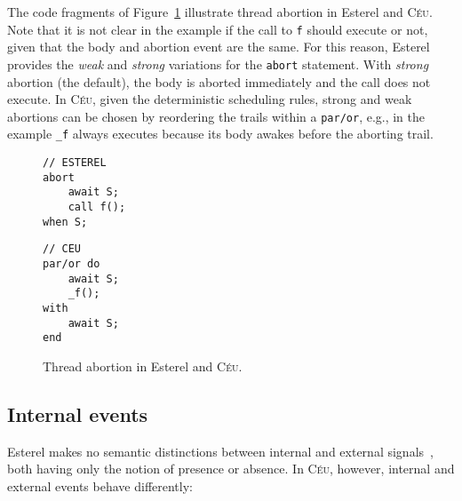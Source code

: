\documentclass{acm_proc_article-sp}
\newcommand{\CEU}{\textsc{C\'{e}u}\xspace}
\newcommand{\code}[1] {{\small{\texttt{#1}}}}
\newcommand{\1}{\;}
\newcommand{\2}{\;\;}
\newcommand{\3}{\;\;\;}
\newcommand{\5}{\;\;\;\;\;}
\begin{document}
The code fragments of Figure~\ref{lst.abortion} illustrate thread abortion in 
Esterel and \CEU.
Note that it is not clear in the example if the call to \code{f} should execute 
or not, given that the body and abortion event are the same.
For this reason, Esterel provides the \emph{weak} and \emph{strong} variations 
for the \code{abort} statement.
With \emph{strong} abortion (the default), the body is aborted immediately and 
the call does not execute.
In \CEU, given the deterministic scheduling rules, strong and weak abortions 
can be chosen by reordering the trails within a \code{par/or}, e.g., in the 
example \code{\_f} always executes because its body awakes before the aborting 
trail.

\begin{figure}[h]
\begin{minipage}[t]{0.45\linewidth}
\begin{lstlisting}
// ESTEREL
abort
    await S;
    call f();
when S;
\end{lstlisting}
\end{minipage}
%
\begin{minipage}[t]{0.45\linewidth}
\begin{lstlisting}
// CEU
par/or do
    await S;
    _f();
with
    await S;
end
\end{lstlisting}
\end{minipage}
\caption{ Thread abortion in Esterel and \CEU. %
\label{lst.abortion}
}
\end{figure}
\begin{comment}
{\small
With strong abortion (default in Esterel), the call to \code{f1} is not 
executed (the \code{abort} can instead be prefixed with the \code{weak} 
keyword).
In \CEU, the \code{par/xor} provides strong and weak abortion depending on the 
chosen order for the trails.
The \code{par/or} provides XXX.
}
\end{comment}



\subsection{Internal events}
\label{sec.ceu.ints}

Esterel makes no semantic distinctions between internal and external 
signals~\cite{esterel.preemption}, both having only the notion of presence or
absence.
%
In \CEU, however, internal and external events behave differently:
\end{document}
